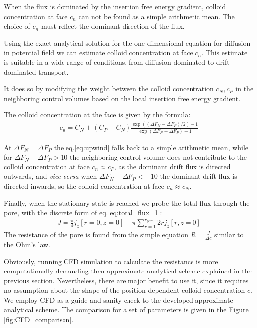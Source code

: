 \documentclass[10pt, a4paper]{article}
\begin{document}
\begin{multicols}{2}
When the flux is dominated by the insertion free energy gradient, colloid concentration at face $c_n$ can not be found as a simple arithmetic mean. 
The choice of $c_n$ must reflect the dominant direction of the flux.

Using the exact analytical solution for the one-dimensional equation for diffusion in potential field we can estimate colloid concentration at face $c_n$. 
This estimate is suitable in a wide range of conditions, from diffusion-dominated to drift-dominated transport.

It does so by modifying the weight between the colloid concentration $c_N, c_P$ in the neighboring control volumes based on the local insertion free energy gradient.

The colloid concentration at the face is given by the formula:
\begin{eqnarray}
    \label{eq:upwind}
    c_n = C_N + (C_P - C_N)\frac{\exp((\Delta F_N - \Delta F_P)/2)-1}{\exp(\Delta F_N - \Delta F_P) - 1}
\end{eqnarray}

At $\Delta F_N = \Delta F_P$ the eq.\ref{eq:upwind} falls back to a simple arithmetic mean, while for $\Delta F_N - \Delta F_P>10$ the neighboring control volume does not contribute to the colloid concentration at face $c_n \approx c_P$, as the dominant drift flux is directed outwards, and \emph{vice versa} when $\Delta F_N - \Delta F_P< -10$ the dominant drift flux is directed inwards, so the colloid concentration at face $c_n \approx c_N$.


Finally, when the stationary state is reached we probe the total flux through the pore, with the discrete form of eq.\ref{eq:total_flux_1}:
\begin{eqnarray}
    \label{eq:total_flux_2}
    J = \frac{\pi}{4} j_z[r=0,z=0] + \pi \sum_{r=1}^{r_\textrm{pore}} 2r  j_z[r,z=0]
\end{eqnarray}
The resistance of the pore is found from the simple equation $R = \frac{J}{\Delta c}$ similar to the Ohm's law.

Obviously, running CFD simulation to calculate the resistance is more computationally demanding then approximate analytical scheme explained in the previous section.
Nevertheless, there are major benefit to use it, since it requires no assumption about the shape of the position-dependent colloid concentration $c$.
We employ CFD as a guide and sanity check to the developed approximate analytical scheme.
The comparison for a set of parameters is given in the Figure \ref{fig:CFD_comparison}.


\end{multicols}
\end{document}
